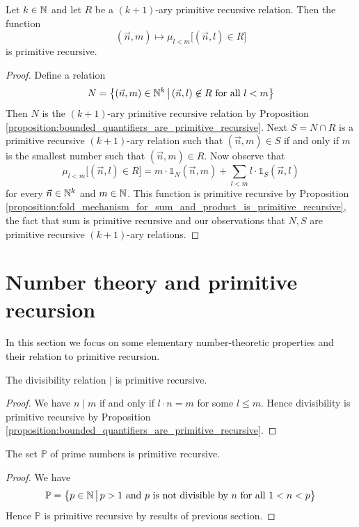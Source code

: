 \documentclass[10pt]{amsart}
\begin{document}
\begin{proposition}\label{proposition:bounded_minimization_is_primitive_recursive_if_relation_is_primitive_recursive}
	Let $k \in {\mathbb N}$ and let $R$ be a $(k + 1)$-ary primitive recursive relation. Then the function
	$$(\vec{n},m)\mapsto \mu_{l < m}\big[(\vec{n},l) \in R\big]$$
	is primitive recursive.
\end{proposition}
\begin{proof}
	Define a relation
	$$N = \big\{(\vec{n},m)\in {\mathbb N}^k\,\big|\,(\vec{n},l) \not \in R\mbox{ for all }l < m\big\}$$
	Then $N$ is the $(k+1)$-ary primitive recursive relation  by Proposition \ref{proposition:bounded_quantifiers_are_primitive_recursive}. Next $S = N\cap R$ is a primitive recursive $(k+1)$-ary relation  such that $(\vec{n},m) \in S$ if and only if $m$ is the smallest number such that $(\vec{n},m) \in R$. Now observe that
	$$\mu_{l < m}\big[(\vec{n},l)\in R\big] = m\cdot \mathbb{1}_N\left(\vec{n},m\right) + \sum_{l < m}l \cdot \mathbb{1}_{S}\left(\vec{n},l\right)$$
	for every $\vec{n} \in {\mathbb N}^k$ and $m \in {\mathbb N}$. This function is primitive recursive  by Proposition \ref{proposition:fold_mechanism_for_sum_and_product_is_primitive_recursive}, the fact that sum is primitive recursive  and our observations that $N,S$ are primitive recursive $(k + 1)$-ary relations.
\end{proof}

\section{Number theory and primitive recursion}
\noindent
In this section we focus on some elementary number-theoretic properties and their relation to primitive recursion.

\begin{proposition}\label{proposition:divisibility_is_primitive_recursive}
	The divisibility relation $\mid$ is primitive recursive.
\end{proposition}
\begin{proof}
	We have $n\mid m$ if and only if $l\cdot n = m$ for some $l \leq m$. Hence divisibility is primitive recursive by Proposition \ref{proposition:bounded_quantifiers_are_primitive_recursive}.
\end{proof}

\begin{proposition}\label{proposition:prime_numbers_are_primitive_recursive}
	The set $\mathbb{P}$ of prime numbers is primitive recursive.
\end{proposition}
\begin{proof}
	We have
	$$\mathbb{P} = \big\{p \in {\mathbb N}\,\big|\,p > 1\mbox{ and }p\mbox{ is not divisible by }n\mbox{ for all }1 < n < p\big\}$$
	Hence $\mathbb{P}$ is primitive recursive by results of previous section.
\end{proof}
\end{document}

